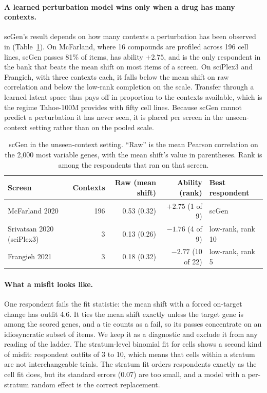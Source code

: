 \documentclass[11pt]{article}
\begin{document}
\paragraph{A learned perturbation model wins only when a drug has many contexts.}
scGen's result depends on how many contexts a perturbation has been observed in
(Table~\ref{tab:scgen}). On McFarland, where 16 compounds are profiled across 196
cell lines, scGen passes 81\% of items, has ability $+2.75$, and is the only
respondent in the bank that beats the mean shift on most items of a screen. On
sciPlex3 and Frangieh, with three contexts each, it falls below the mean shift on raw
correlation and below the low-rank completion on the scale. Transfer through a learned
latent space thus pays off in proportion to the contexts available, which is the
regime Tahoe-100M provides with fifty cell lines. Because scGen cannot predict a
perturbation it has never seen, it is placed per screen in the unseen-context setting
rather than on the pooled scale.

\begin{table}[t]
\centering
\small
\caption{scGen in the unseen-context setting. ``Raw'' is the mean Pearson correlation on the
2,000 most variable genes, with the mean shift's value in parentheses. Rank is among the
respondents that ran on that screen.}
\label{tab:scgen}
\begin{tabular}{@{}lrrrl@{}}
\toprule
Screen & Contexts & Raw (mean shift) & Ability (rank) & Best respondent \\
\midrule
McFarland 2020 & 196 & 0.53 (0.32) & $+2.75$ (1 of 9) & scGen \\
Srivatsan 2020 (sciPlex3) & 3 & 0.13 (0.26) & $-1.76$ (4 of 9) & low-rank, rank 10 \\
Frangieh 2021 & 3 & 0.18 (0.32) & $-2.77$ (10 of 22) & low-rank, rank 5 \\
\bottomrule
\end{tabular}
\end{table}

\paragraph{What a misfit looks like.}
One respondent fails the fit statistic: the mean shift with a forced on-target change
has outfit 4.6. It ties the mean shift exactly unless the target gene is among the
scored genes, and a tie counts as a fail, so its passes concentrate on an
idiosyncratic subset of items. We keep it as a diagnostic and exclude it from any
reading of the ladder. The stratum-level binomial fit for cells shows a second kind
of misfit: respondent outfits of 3 to 10, which means that cells within a stratum are
not interchangeable trials. The stratum fit orders respondents exactly as the cell
fit does, but its standard errors (0.07) are too small, and a model with a per-stratum
random effect is the correct replacement.
\end{document}
